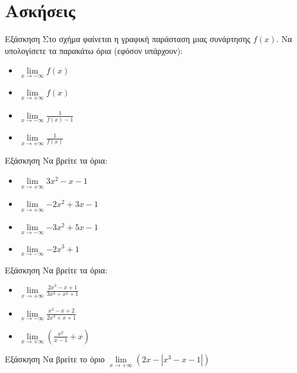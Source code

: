 \documentclass[greek]{beamer}
\begin{document}
\section{Ασκήσεις}
\begin{frame}{Εξάσκηση}
      Στο σχήμα
      \href{https://www.geogebra.org/m/p9xmedm8}{}
      φαίνεται η γραφική παράσταση μιας συνάρτησης $f(x)$. Να υπολογίσετε τα παρακάτω όρια (εφόσον υπάρχουν):
      \begin{itemize}
            \item $\lim\limits_{x \to -\infty}{ f(x) }$ \pause
            \item $\lim\limits_{x \to +\infty}{ f(x) }$ \pause
            \item $\lim\limits_{x \to -\infty}{ \frac{1}{f(x)-1} }$ \pause
            \item $\lim\limits_{x \to +\infty}{ \frac{1}{f(x)} }$
      \end{itemize}
\end{frame}

\begin{frame}{Εξάσκηση}
      Να βρείτε τα όρια:
      \begin{itemize}
            \item $\lim\limits_{x \to +\infty}{ 3x^2-x-1 }$ \pause
            \item $\lim\limits_{x \to +\infty}{ -2x^2+3x-1 }$ \pause
            \item $\lim\limits_{x \to -\infty}{ -3x^2+5x-1 }$ \pause
            \item $\lim\limits_{x \to -\infty}{ -2x^3+1 }$
      \end{itemize}
\end{frame}

\begin{frame}{Εξάσκηση}
      Να βρείτε τα όρια:
      \begin{itemize}
            \item $\lim\limits_{x \to +\infty}{ \frac{2x^3-x+1}{3x^3+x^2+1} }$ \pause
            \item $\lim\limits_{x \to -\infty}{ \frac{x^2-x+2}{2x^3+x+1} }$ \pause
            \item $\lim\limits_{x \to +\infty}{ \left( \frac{x^2}{x-1}+x  \right)  }$
      \end{itemize}
\end{frame}

\begin{frame}{Εξάσκηση}
      Να βρείτε το όριο $\lim\limits_{x \to +\infty}{ \left( 2x-|x^3-x-1| \right)  }$
\end{frame}
\end{document}
